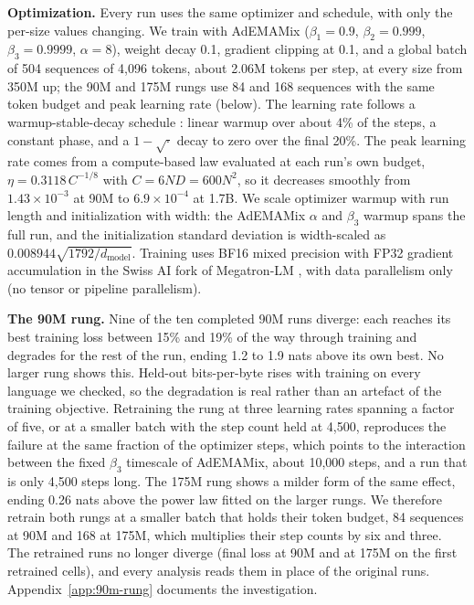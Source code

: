 \textbf{Optimization.} Every run uses the same optimizer and schedule, with only the per-size values changing. We train with AdEMAMix \citep{pagliardini_ademamix_2024} ($\beta_1 = 0.9$, $\beta_2 = 0.999$, $\beta_3 = 0.9999$, $\alpha = 8$), weight decay 0.1, gradient clipping at 0.1, and a global batch of 504 sequences of 4,096 tokens, about 2.06M tokens per step, at every size from 350M up; the 90M and 175M rungs use 84 and 168 sequences with the same token budget and peak learning rate (below). The learning rate follows a warmup-stable-decay schedule \citep{hagele_scaling_2024}: linear warmup over about 4\% of the steps, a constant phase, and a $1-\sqrt{\cdot}$ decay to zero over the final 20\%. The peak learning rate comes from a compute-based law evaluated at each run's own budget, $\eta = 0.3118\, C^{-1/8}$ with $C = 6 N D = 600 N^2$, so it decreases smoothly from $1.43 \times 10^{-3}$ at 90M to $6.9 \times 10^{-4}$ at 1.7B. We scale optimizer warmup with run length and initialization with width: the AdEMAMix $\alpha$ and $\beta_3$ warmup spans the full run, and the initialization standard deviation is width-scaled as $0.008944 \sqrt{1792 / d_{\mathrm{model}}}$. Training uses BF16 mixed precision with FP32 gradient accumulation in the Swiss AI fork of Megatron-LM \citep{shoeybi_megatron-lm_2019}, with data parallelism only (no tensor or pipeline parallelism).

\textbf{The 90M rung.} Nine of the ten completed 90M runs diverge: each reaches its best training loss between 15\% and 19\% of the way through training and degrades for the rest of the run, ending 1.2 to 1.9 nats above its own best. No larger rung shows this. Held-out bits-per-byte rises with training on every language we checked, so the degradation is real rather than an artefact of the training objective. Retraining the rung at three learning rates spanning a factor of five, or at a smaller batch with the step count held at 4,500, reproduces the failure at the same fraction of the optimizer steps, which points to the interaction between the fixed $\beta_3$ timescale of AdEMAMix, about 10,000 steps, and a run that is only 4,500 steps long. The 175M rung shows a milder form of the same effect, ending 0.26 nats above the power law fitted on the larger rungs. We therefore retrain both rungs at a smaller batch that holds their token budget, 84 sequences at 90M and 168 at 175M, which multiplies their step counts by six and three. The retrained runs no longer diverge (final loss  at 90M and  at 175M on the first retrained cells), and every analysis reads them in place of the original runs. Appendix~\ref{app:90m-rung} documents the investigation.


